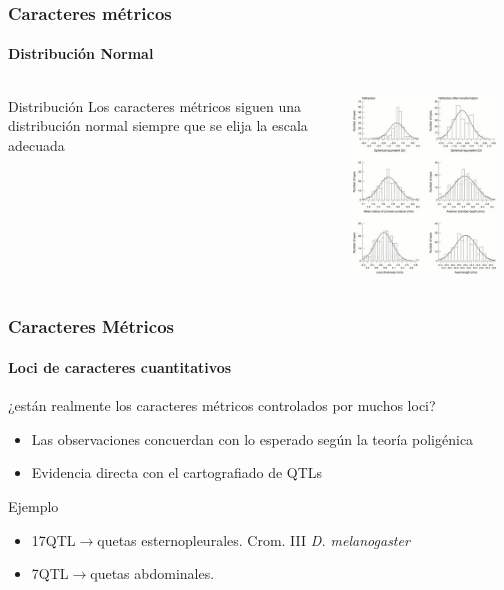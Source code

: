 \documentclass{beamer}
\newenvironment{caja}
{
\begin{beamerboxesrounded}[upper=upcol,lower=lowcol,shadow=true]}
{\end{beamerboxesrounded}}
\begin{document}
\begin{frame}
\frametitle{Caracteres métricos}
\framesubtitle{Distribución Normal}
\begin{columns}
\begin{column}{0.3\textwidth}
\begin{caja}{Distribución}
Los caracteres métricos siguen una distribución normal siempre que se elija la escala adecuada
\end{caja}
\end{column}
\hfill\pause
\begin{column}{0.6\textwidth}
\includegraphics[width=0.9\textwidth]{fotos/distribucion.jpg}
\end{column}
\end{columns}
\end{frame}


\begin{frame}
\frametitle{Caracteres Métricos}
\framesubtitle{Loci de caracteres cuantitativos}
\begin{caja}{¿están realmente los caracteres métricos controlados por muchos loci?}
\begin{itemize}[<+- | alert@+>]
\item Las observaciones concuerdan con lo esperado según la teoría poligénica
\item Evidencia directa con el cartografiado de QTLs
\end{itemize}
\end{caja}
\pause
\begin{caja}{Ejemplo}
\begin{itemize}
\item 17QTL$\rightarrow$quetas esternopleurales. Crom. III \emph{D. melanogaster}
\item 7QTL$\rightarrow$quetas abdominales.
\end{itemize}
\end{caja}
\end{frame}
\end{document}
